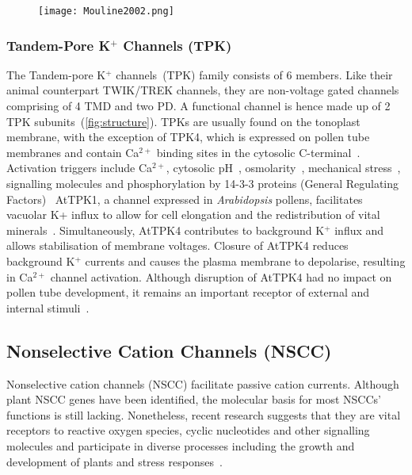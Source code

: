 \documentclass[11pt]{article}
\begin{document}
\begin{multicols*}{2}
\begin{figure}[H]
  \centering
    \texttt{[image: Mouline2002.png]}
  \label{fig:SPIKmutant}
\end{figure}

\subsubsection{Tandem-Pore K$^{+}$ Channels (TPK)}
The Tandem-pore K$^{+}$ channels~(TPK) family consists of 6 members. Like their animal counterpart TWIK/TREK channels, they are non-voltage gated channels comprising of 4 TMD and two PD. A functional channel is hence made up of 2 TPK subunits~(\autoref{fig:structure}). TPKs are usually found on the tonoplast membrane, with the exception of TPK4, which is expressed on pollen tube membranes and contain Ca$^{2+}$ binding sites in the cytosolic C-terminal~\citep{Czempinski1997}. Activation triggers include Ca$^{2+}$, cytosolic pH~\citep{Latz2007}, osmolarity~\citep{Maathuis2011}, mechanical stress~\citep{Bagriantsev2011}, signalling molecules and phosphorylation by 14-3-3 proteins (General Regulating Factors)~\citep{Voelker2010}
\newline\newline
AtTPK1, a channel expressed in \textit{Arabidopsis} pollens, facilitates vacuolar K+ influx to allow for cell elongation and the redistribution of vital minerals~\citep{Gobert2007,Maitrejean2011}. Simultaneously, AtTPK4 contributes to background K$^{+}$ influx and allows stabilisation of membrane voltages. Closure of AtTPK4 reduces background K$^{+}$ currents and causes the plasma membrane to depolarise, resulting in Ca$^{2+}$ channel activation. Although disruption of AtTPK4 had no impact on pollen tube development, it remains an important receptor of external and internal stimuli~\citep{Becker2004a}.

\subsection{Nonselective Cation Channels (NSCC)}
Nonselective cation channels (NSCC) facilitate passive cation currents. Although plant NSCC genes have been identified, the molecular basis for most NSCCs' functions is still lacking. Nonetheless, recent research suggests that they are vital receptors to reactive oxygen species, cyclic nucleotides and other signalling molecules and participate in diverse processes including the growth and development of plants and stress responses~\citep{Demidchik2007}.


\end{multicols*}
\end{document}

